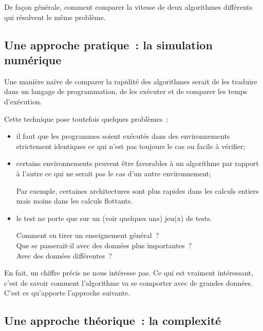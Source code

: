 		De façon générale, comment comparer la vitesse de deux algorithmes
		différents qui résolvent le même problème.
		
		\subsection{Une approche pratique~: la simulation numérique}
	
			Une manière naïve de comparer la rapidité des algorithmes serait de
			les traduire dans un langage de programmation, de les exécuter et de
			comparer les temps d'exécution.

			Cette technique pose toutefois quelques problèmes~:			
			\begin{itemize}
				
				\item il faut que les programmes soient exécutés 
					dans des environnements strictement identiques 
					ce qui n’est pas toujours le cas ou facile à vérifier;
				
				\item certains environnements peuvent être favorables à un
					algorithme par rapport à l’autre ce qui ne serait pas le cas
					d’un autre environnement;
					
					Par exemple, certaines architectures
					sont plus rapides dans les calculs entiers
					mais moins dans les calculs flottants.
				
				\item le test ne porte que sur un (voir quelques uns) jeu(x) de
					tests.  
					
					Comment en tirer un enseignement général~?\\
					Que se passerait-il avec des données plus importantes~?\\
					Avec des données différentes~?
		
			\end{itemize}	

			En fait, un chiffre précis ne nous intéresse pas.  Ce qui est
			vraiment intéressant, c’est de savoir comment l’algorithme va se
			comporter avec de grandes données.  C’est ce qu’apporte l’approche
			suivante.
		
		\subsection{Une approche théorique~: la complexité}
		
